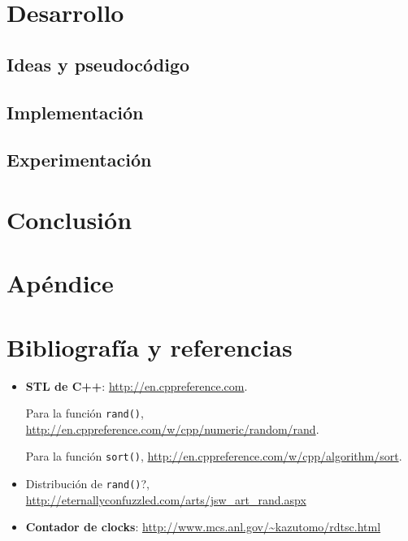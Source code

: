 \vspace{\baselineskip}
\par 


   

\section{Desarrollo}

\subsection{Ideas y pseudocódigo}

\subsection{Implementación}

\subsection{Experimentación}

\section{Conclusión}

\section{Apéndice}

\section{Bibliografía y referencias} %

\begin{itemize}
	\item \textbf{STL de C++}: \url{http://en.cppreference.com}.
	\par Para la función \texttt{rand()}, \url{http://en.cppreference.com/w/cpp/numeric/random/rand}.
	\par Para la función \texttt{sort()}, \url{http://en.cppreference.com/w/cpp/algorithm/sort}.
	\item Distribución de \texttt{rand()}?, \url{http://eternallyconfuzzled.com/arts/jsw\_art\_rand.aspx}
	\item \textbf{Contador de clocks}: \url{http://www.mcs.anl.gov/\~kazutomo/rdtsc.html}
\end{itemize}



